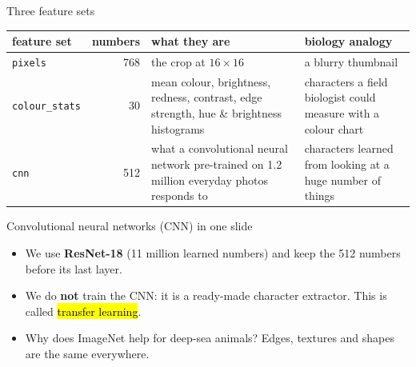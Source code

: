 \documentclass[aspectratio=169,11pt]{beamer}
\begin{document}
\begin{frame}{Three feature sets}
\small
\begin{tabularx}{\linewidth}{@{}l r X X@{}}
\toprule
\textbf{feature set} & \textbf{numbers} & \textbf{what they are} & \textbf{biology analogy} \\
\midrule
\texttt{pixels} & 768 & the crop at $16\times16$ & a blurry thumbnail \\
\texttt{colour\_stats} & 30 & mean colour, brightness, redness, contrast, edge strength, hue \& brightness histograms & characters a field biologist could measure with a colour chart \\
\texttt{cnn} & 512 & what a convolutional neural network pre-trained on 1.2 million everyday photos responds to & characters learned from looking at a huge number of things \\
\bottomrule
\end{tabularx}
\end{frame}

\begin{frame}{Convolutional neural networks (CNN) in one slide}
\centering
{}
\vspace{2pt}
\begin{itemize}\footnotesize
  \item We use \textbf{ResNet-18} (11 million learned numbers) and keep the 512 numbers before its last layer.
  \item We do \textbf{not} train the CNN: it is a ready-made character extractor. This is called \hl{transfer learning}.
  \item Why does ImageNet help for deep-sea animals? Edges, textures and shapes are the same everywhere.
\end{itemize}
\end{frame}
\end{document}
